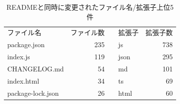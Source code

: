 \documentclass[submit]{ipsj}
\begin{document}
\begin{table}[t]
 \centering
 \caption{評価用データ}
\label{tab:result}
\end{table}

\begin{table}[t]
  \caption{READMEと同時に変更されたファイル名/拡張子上位5件}
  \centering
  \begin{tabular}{l|rll|r}
    \cline{1-2}\noalign{\vspace{1pt}}\cline{1-2}\cline{4-5}\noalign{\vspace{1pt}}\cline{4-5}
    ファイル名 & ファイル数 && 拡張子 & 拡張子数\\
    \cline{1-2}\cline{4-5}
    package.json       & 235 && js & 738\\
    index.js           & 119 && json & 295\\
    CHANGELOG.md       & 54 && md & 101\\
    index.html         & 34 && ts & 69\\
    package-lock.json  & 26 && html & 60\\
    \cline{1-2}\cline{4-5}
  \end{tabular}


  \label{tab:file_comparison}
\end{table}
\end{document}
